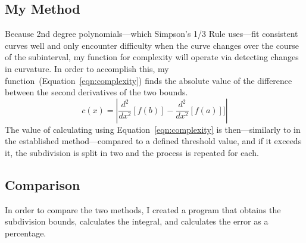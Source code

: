 \documentclass{paper}
\newcommand{\sder}[1]{\dfrac{d^2}{dx^2}\left[#1\right]}
\begin{document}
\subsection{My Method}
Because 2nd degree polynomials---which Simpson's 1/3 Rule uses---fit consistent curves well and only encounter difficulty when the curve changes over the course of the subinterval, my function for complexity will operate via detecting changes in curvature.
In order to accomplish this, my function~(Equation~\ref{eqn:complexity}) finds the absolute value of the difference between the second derivatives of the two bounds.
%
\begin{equation}
    \label{eqn:complexity}
    c(x) = \left|\sder{f(b)} - \sder{f(a)}]\right|
\end{equation}
%
The value of calculating using Equation~\ref{eqn:complexity} is then---similarly to in the established method---compared to a defined threshold value, and if it exceeds it, the subdivision is split in two and the process is repeated for each.

\subsection{Comparison}
In order to compare the two methods, I created a program that obtains the subdivision bounds, calculates the integral, and calculates the error as a percentage.
%




%
\end{document}
